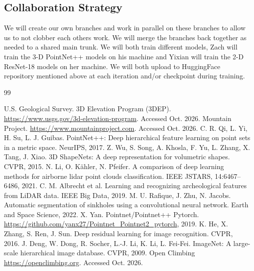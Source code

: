 \documentclass{mva2011}
\begin{document}
   \subsection{Collaboration Strategy}
   We will create our own branches and work in parallel on these branches to allow us to not clobber each others work. We will merge the branches back together as needed to a shared main trunk. We will both train different models, Zach will train the 3-D PointNet++ models on his machine and Yixian will train the 2-D ResNet-18 models on her machine. We will both upload to HuggingFace repository mentioned above at each iteration and/or checkpoint during training.

   

\begin{thebibliography}{99}

 U.S. Geological Survey. 3D Elevation Program (3DEP). \url{https://www.usgs.gov/3d-elevation-program}. Accessed Oct. 2026.
 Mountain Project.
\url{https://www.mountainproject.com}. Accessed Oct. 2026.
 C. R. Qi, L. Yi, H. Su, L. J. Guibas. PointNet++: Deep hierarchical feature learning on point sets in a metric space. NeurIPS, 2017.
 Z. Wu, S. Song, A. Khosla, F. Yu, L. Zhang, X. Tang, J. Xiao. 3D ShapeNets: A deep representation for volumetric shapes. CVPR, 2015.
 N. Li, O. K\"ahler, N. Pfeifer. A comparison of deep learning methods for airborne lidar point clouds classification. IEEE JSTARS, 14:6467--6486, 2021.
 C. M. Albrecht et al. Learning and recognizing archeological features from LiDAR data. IEEE Big Data, 2019.
 M. U. Rafique, J. Zhu, N. Jacobs. Automatic segmentation of sinkholes using a convolutional neural network. Earth and Space Science, 2022.
 X. Yan. Pointnet/Pointnet++ Pytorch. \url{https://github.com/yanx27/Pointnet_Pointnet2_pytorch}, 2019.
 K. He, X. Zhang, S. Ren, J. Sun. Deep residual learning for image recognition. CVPR, 2016.
 J. Deng, W. Dong, R. Socher, L.-J. Li, K. Li, L. Fei-Fei. ImageNet: A large-scale hierarchical image database. CVPR, 2009.
 Open Climbing \url{https://openclimbing.org}. Accessed Oct. 2026.
\end{thebibliography}
\end{document}
